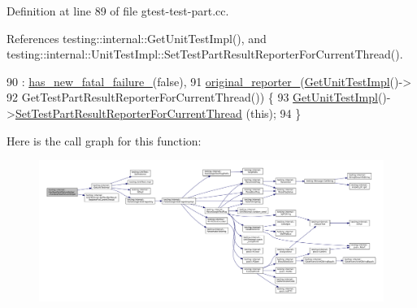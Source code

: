 Definition at line 89 of file gtest-\/test-\/part.\+cc.



References testing\+::internal\+::\+Get\+Unit\+Test\+Impl(), and testing\+::internal\+::\+Unit\+Test\+Impl\+::\+Set\+Test\+Part\+Result\+Reporter\+For\+Current\+Thread().


\begin{DoxyCode}
90     : \hyperlink{classtesting_1_1internal_1_1HasNewFatalFailureHelper_a172103f6aefee8c387a44679888fee30}{has\_new\_fatal\_failure\_}(\textcolor{keyword}{false}),
91       \hyperlink{classtesting_1_1internal_1_1HasNewFatalFailureHelper_a9f8be46b6aa39666e4a8557f240629e5}{original\_reporter\_}(\hyperlink{namespacetesting_1_1internal_a9bd0caf5d16512de38b39599c13ee634}{GetUnitTestImpl}()->
92                          GetTestPartResultReporterForCurrentThread()) \{
93   \hyperlink{namespacetesting_1_1internal_a9bd0caf5d16512de38b39599c13ee634}{GetUnitTestImpl}()->\hyperlink{classtesting_1_1internal_1_1UnitTestImpl_a1403fc10aebcc64479c5ee980c9b4eb4}{SetTestPartResultReporterForCurrentThread}
      (\textcolor{keyword}{this});
94 \}
\end{DoxyCode}
Here is the call graph for this function\+:
\nopagebreak
\begin{figure}[H]
\begin{center}
\leavevmode
\includegraphics[width=350pt]{classtesting_1_1internal_1_1HasNewFatalFailureHelper_a59190a7188db558c00b4c6bf9251859a_cgraph}
\end{center}
\end{figure}
\mbox{\label{classtesting_1_1internal_1_1HasNewFatalFailureHelper_a913b1bc7c372868c9b2dbb009044ee97}} 
